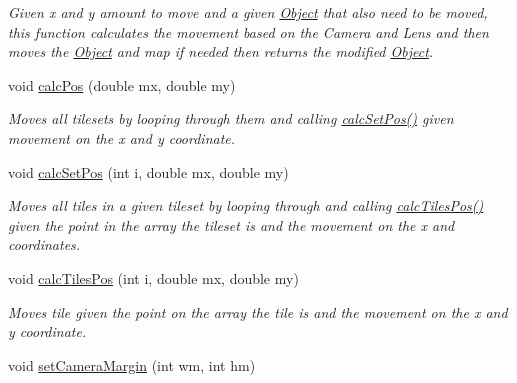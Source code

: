 \begin{DoxyCompactItemize}
\begin{DoxyCompactList}\small\item\em Given x and y amount to move and a given \hyperlink{classObject}{Object} that also need to be moved, this function calculates the movement based on the Camera and Lens and then moves the \hyperlink{classObject}{Object} and map if needed then returns the modified \hyperlink{classObject}{Object}. \end{DoxyCompactList}\item 
void \hyperlink{classTileset_a5910c3fdfcabddbc45c81d8337acbef6}{calc\+Pos} (double mx, double my)\hypertarget{classTileset_a5910c3fdfcabddbc45c81d8337acbef6}{}\label{classTileset_a5910c3fdfcabddbc45c81d8337acbef6}

\begin{DoxyCompactList}\small\item\em Moves all tilesets by looping through them and calling \hyperlink{classTileset_afbcba6ec8087f3b14d96a538159cc3a3}{calc\+Set\+Pos()} given movement on the x and y coordinate. \end{DoxyCompactList}\item 
void \hyperlink{classTileset_afbcba6ec8087f3b14d96a538159cc3a3}{calc\+Set\+Pos} (int i, double mx, double my)\hypertarget{classTileset_afbcba6ec8087f3b14d96a538159cc3a3}{}\label{classTileset_afbcba6ec8087f3b14d96a538159cc3a3}

\begin{DoxyCompactList}\small\item\em Moves all tiles in a given tileset by looping through and calling \hyperlink{classTileset_ad3601a9387ed892072e7c05a3b3081eb}{calc\+Tiles\+Pos()} given the point in the array the tileset is and the movement on the x and coordinates. \end{DoxyCompactList}\item 
void \hyperlink{classTileset_ad3601a9387ed892072e7c05a3b3081eb}{calc\+Tiles\+Pos} (int i, double mx, double my)\hypertarget{classTileset_ad3601a9387ed892072e7c05a3b3081eb}{}\label{classTileset_ad3601a9387ed892072e7c05a3b3081eb}

\begin{DoxyCompactList}\small\item\em Moves tile given the point on the array the tile is and the movement on the x and y coordinate. \end{DoxyCompactList}\item 
void \hyperlink{classTileset_ac731488d266bd1a46d0514ee52344fa9}{set\+Camera\+Margin} (int wm, int hm)\hypertarget{classTileset_ac731488d266bd1a46d0514ee52344fa9}{}\label{classTileset_ac731488d266bd1a46d0514ee52344fa9}


\end{DoxyCompactItemize}
